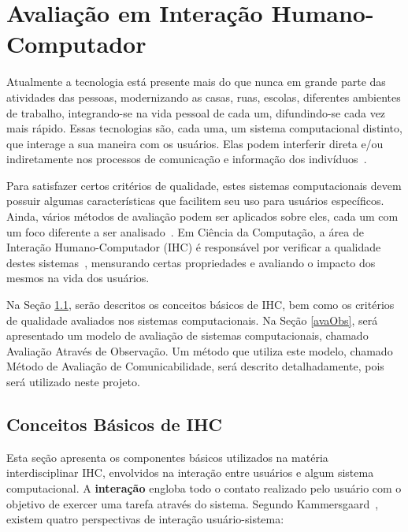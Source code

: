 \chapter{Avaliação em Interação Humano-Computador}

\indent Atualmente a tecnologia está presente mais do que nunca em grande parte das atividades das pessoas, modernizando as casas, ruas, escolas, diferentes ambientes de trabalho, integrando-se na vida pessoal de cada um, difundindo-se cada vez mais rápido. Essas tecnologias são, cada uma, um sistema computacional distinto, que interage a sua maneira com os usuários. Elas podem interferir direta e/ou indiretamente nos processos de comunicação e informação dos indivíduos~\cite{tics}. 

\indent Para satisfazer certos critérios de qualidade, estes sistemas computacionais devem possuir algumas características que facilitem seu uso para usuários específicos. Ainda, vários métodos de avaliação podem ser aplicados sobre eles, cada um com um foco diferente a ser analisado~\cite{IHCbook}. Em Ciência da Computação, a área de Interação Humano-Computador (IHC) é responsável por verificar a qualidade destes sistemas~\cite{IHCbook}, mensurando certas propriedades e avaliando o impacto dos mesmos na vida dos usuários. 

\indent Na Seção \ref{cbIHC}, serão descritos os conceitos básicos de IHC, bem como os critérios de qualidade avaliados nos sistemas computacionais. Na Seção \ref{avaObs}, será apresentado um modelo de avaliação de sistemas computacionais, chamado Avaliação Através de Observação. Um método que utiliza este modelo, chamado Método de Avaliação de Comunicabilidade, será descrito detalhadamente, pois será utilizado neste projeto.
 
\section{Conceitos Básicos de IHC} \label{cbIHC}

\indent Esta seção apresenta os componentes básicos utilizados na matéria interdisciplinar IHC, envolvidos na interação entre usuários e algum sistema computacional. A \textbf{interação} engloba todo o contato realizado pelo usuário com o objetivo de exercer uma tarefa através do sistema. Segundo Kammersgaard~\cite{IHCbook}, existem quatro perspectivas de interação usuário-sistema:

